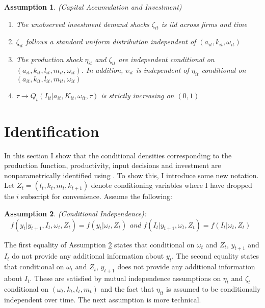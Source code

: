 \documentclass{article}
\newtheorem{assump}{Assumption}[section]
\begin{document}
\begin{assump} (Capital Accumulation and Investment) \label{ik1}
~
\begin{enumerate}[label=(\alph*)]
	\item The unobserved investment demand shocks $\zeta_{it}$ is iid across firms and time
    \item $\zeta_{it}$ follows a standard uniform distribution independent of $(a_{it}, k_{it}, \omega_{it})$
    \item The production shock $\eta_{it}$ and $\zeta_{it}$ are independent conditional on $(a_{it}, k_{it}, l_{it}, m_{it}, \omega_{it})$. In addition, $\upsilon_{it}$ is independent of $\eta_{it}$ conditional on $(a_{it}, k_{it}, l_{it}, m_{it}, \omega_{it})$
    \item $\tau\rightarrow Q_{t}(I_{it}|a_{it}, K_{it}, \omega_{it}, \tau)$ is strictly increasing on $(0,1)$
\end{enumerate}
\end{assump}


\section{Identification} \label{identification}

In this section I show that the conditional densities corresponding to the production function, productivity, input decisions and investment are nonparametrically identified using \cite{Hu2008}. To show this, I introduce some new notation. Let $Z_{t}=(l_{t}, k_{t}, m_{t}, k_{t+1})$ denote conditioning variables where I have dropped the $i$ subscript for convenience. Assume the following: 

\begin{assump} (Conditional Independence):\\ \label{conditionalindependence}
~
$f(y_{t}|y_{t+1}, I_{t}, \omega_{t}, Z_{t})=f(y_{t}|\omega_{t}, Z_{t})$ and
$f(I_{t}|y_{t+1}, \omega_{t}, Z_{t})=f(I_{t}|\omega_{t}, Z_{t})$
\end{assump}
The first equality of Assumption \ref{conditionalindependence} states that conditional on $\omega_{t}$ and $Z_{t}$, $y_{t+1}$ and $I_{t}$ do not provide any additional information about $y_{t}$. The second equality states that conditional on $\omega_{t}$ and $Z_{t}$, $y_{t+1}$ does not provide any additional information about $I_{t}$. These are satisfied by mutual independence assumptions on $\eta_{t}$ and $\zeta_{t}$ conditional on $(\omega_{t}, k_{t}, l_{t}, m_{t})$ and the fact that $\eta_{it}$ is assumed to be conditionally independent over time. The next assumption is more technical.
\end{document}
